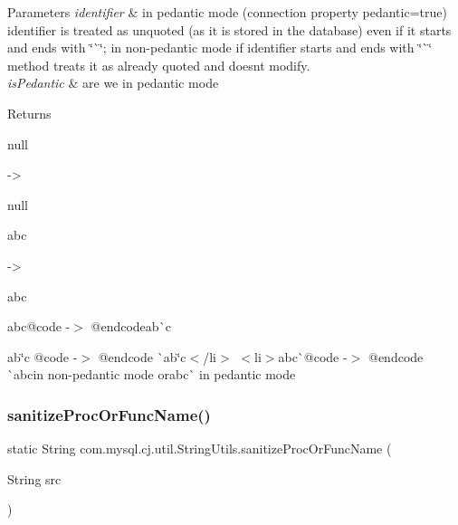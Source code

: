 \begin{DoxyParams}{Parameters}
{\em identifier} & in pedantic mode (connection property pedantic=true) identifier is treated as unquoted (as it is stored in the database) even if it starts and ends with \char`\"{}\`{}\char`\"{}; in non-\/pedantic mode if identifier starts and ends with \char`\"{}\`{}\char`\"{} method treats it as already quoted and doesn\textquotesingle{}t modify. \\
\hline
{\em is\+Pedantic} & are we in pedantic mode\\
\hline
\end{DoxyParams}
\begin{DoxyReturn}{Returns}

\begin{DoxyItemize}
\item null
\begin{DoxyCode}
-> 
\end{DoxyCode}
 null 
\item abc
\begin{DoxyCode}
-> 
\end{DoxyCode}
 {\ttfamily abc} 
\item ab{\ttfamily c@code -\/$>$ @endcode}ab\`{}{\ttfamily c} 
\item ab\char`\"{}c @code -\/$>$ @endcode  \`{}ab\char`\"{}c{\ttfamily $<$/li$>$ $<$li$>$}ab{\ttfamily c\`{}@code -\/$>$ @endcode \`{}ab}c{\ttfamily in non-\/pedantic mode or}{\ttfamily ab}{\ttfamily c}\`{} in pedantic mode 
\end{DoxyItemize}
\end{DoxyReturn}
\mbox{\label{classcom_1_1mysql_1_1cj_1_1util_1_1_string_utils_a465f0e5c11f81ab8aab8913e9a3f4e4d}} 
\subsubsection{\texorpdfstring{sanitize\+Proc\+Or\+Func\+Name()}{sanitizeProcOrFuncName()}}
{\footnotesize\ttfamily static String com.\+mysql.\+cj.\+util.\+String\+Utils.\+sanitize\+Proc\+Or\+Func\+Name (\begin{DoxyParamCaption}\item[{String}]{src }\end{DoxyParamCaption})\hspace{0.3cm}{\ttfamily [static]}}

